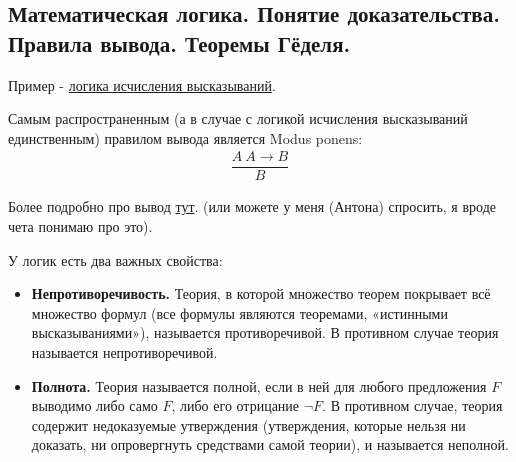 \subsection{Математическая логика. Понятие доказательства. Правила вывода. Теоремы Гёделя.}


Пример - \href{https://ru.wikipedia.org/wiki/%D0%9B%D0%BE%D0%B3%D0%B8%D0%BA%D0%B0_%D0%B2%D1%8B%D1%81%D0%BA%D0%B0%D0%B7%D1%8B%D0%B2%D0%B0%D0%BD%D0%B8%D0%B9#%D0%90%D0%BA%D1%81%D0%B8%D0%BE%D0%BC%D1%8B_%D0%B8_%D0%BF%D1%80%D0%B0%D0%B2%D0%B8%D0%BB%D0%B0_%D0%B2%D1%8B%D0%B2%D0%BE%D0%B4%D0%B0_%D1%84%D0%BE%D1%80%D0%BC%D0%B0%D0%BB%D1%8C%D0%BD%D0%BE%D0%B9_%D1%81%D0%B8%D1%81%D1%82%D0%B5%D0%BC%D1%8B_%D0%BB%D0%BE%D0%B3%D0%B8%D0%BA%D0%B8_%D0%B2%D1%8B%D1%81%D0%BA%D0%B0%D0%B7%D1%8B%D0%B2%D0%B0%D0%BD%D0%B8%D0%B9}{логика исчисления высказываний}.

Самым распространенным (а в случае с логикой исчисления высказываний единственным) правилом вывода является Modus ponens:
\begin{align*}
	\dfrac{A\ A \rightarrow B}{B}
\end{align*}



Более подробно про вывод \href{http://fkn.univer.omsk.su/kursi/disc/prlogic.htm#2.9}{тут}. (или можете у меня (Антона) спросить, я вроде чета понимаю про это).

У логик есть два важных свойства:
\begin{itemize}
	\item \textbf{Непротиворечивость.} Теория, в которой множество теорем покрывает всё множество формул (все формулы являются теоремами, «истинными высказываниями»), называется противоречивой. В противном случае теория называется непротиворечивой.
	\item \textbf{Полнота.} Теория называется полной, если в ней для любого предложения $F$ выводимо либо само $F$, либо его отрицание $\neg F$. В противном случае, теория содержит недоказуемые утверждения (утверждения, которые нельзя ни доказать, ни опровергнуть средствами самой теории), и называется неполной. 
\end{itemize}

